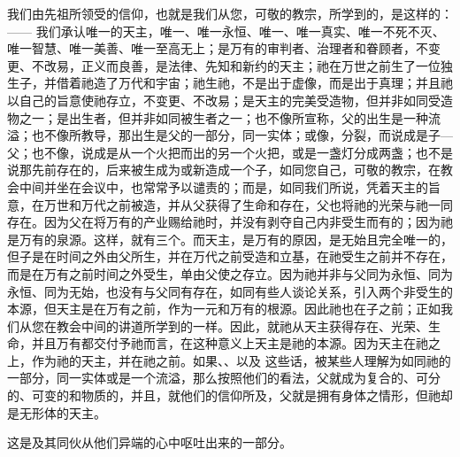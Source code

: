 我们由先祖所领受的信仰，也就是我们从您，可敬的教宗，所学到的，是这样的：—— 我们承认唯一的天主，唯一、唯一永恒、唯一、唯一真实、唯一不死不灭、唯一智慧、唯一美善、唯一至高无上；是万有的审判者、治理者和眷顾者，不变更、不改易，正义而良善，是法律、先知和新约的天主；祂在万世之前生了一位独生子，并借着祂造了万代和宇宙；祂生祂，不是出于虚像，而是出于真理；并且祂以自己的旨意使祂存立，不变更、不改易；是天主的完美受造物，但并非如同受造物之一；是出生者，但并非如同被生者之一；也不像所宣称，父的出生是一种流溢；也不像所教导，那出生是父的一部分，同一实体；或像，分裂，而说成是子—父；也不像，说成是从一个火把而出的另一个火把，或是一盏灯分成两盏；也不是说那先前存在的，后来被生成为或新造成一个子，如同您自己，可敬的教宗，在教会中间并坐在会议中，也常常予以谴责的；而是，如同我们所说，凭着天主的旨意，在万世和万代之前被造，并从父获得了生命和存在，父也将祂的光荣与祂一同存在。因为父在将万有的产业赐给祂时，并没有剥夺自己内非受生而有的；因为祂是万有的泉源。这样，就有三个。而天主，是万有的原因，是无始且完全唯一的，但子是在时间之外由父所生，并在万代之前受造和立基，在祂受生之前并不存在，而是在万有之前时间之外受生，单由父使之存立。因为祂并非与父同为永恒、同为永恒、同为无始，也没有与父同有存在，如同有些人谈论关系，引入两个非受生的本源，但天主是在万有之前，作为一元和万有的根源。因此祂也在子之前；正如我们从您在教会中间的讲道所学到的一样。因此，就祂从天主获得存在、光荣、生命，并且万有都交付予祂而言，在这种意义上天主是祂的本源。因为天主在祂之上，作为祂的天主，并在祂之前。如果、、以及  这些话，被某些人理解为如同祂的一部分，同一实体或是一个流溢，那么按照他们的看法，父就成为复合的、可分的、可变的和物质的，并且，就他们的信仰所及，父就是拥有身体之情形，但祂却是无形体的天主。\par

这是及其同伙从他们异端的心中呕吐出来的一部分。\par

